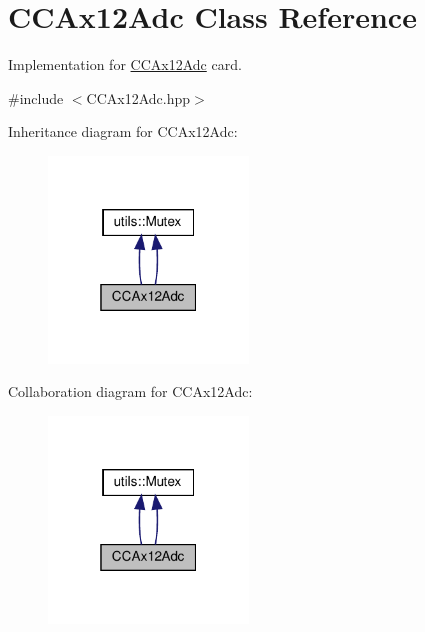 \hypertarget{classCCAx12Adc}{}\section{C\+C\+Ax12\+Adc Class Reference}
\label{classCCAx12Adc}


Implementation for \hyperlink{classCCAx12Adc}{C\+C\+Ax12\+Adc} card.  




{\ttfamily \#include $<$C\+C\+Ax12\+Adc.\+hpp$>$}



Inheritance diagram for C\+C\+Ax12\+Adc\+:
\nopagebreak
\begin{figure}[H]
\begin{center}
\leavevmode
\includegraphics[width=151pt]{classCCAx12Adc__inherit__graph}
\end{center}
\end{figure}


Collaboration diagram for C\+C\+Ax12\+Adc\+:
\nopagebreak
\begin{figure}[H]
\begin{center}
\leavevmode
\includegraphics[width=151pt]{classCCAx12Adc__coll__graph}
\end{center}
\end{figure}
